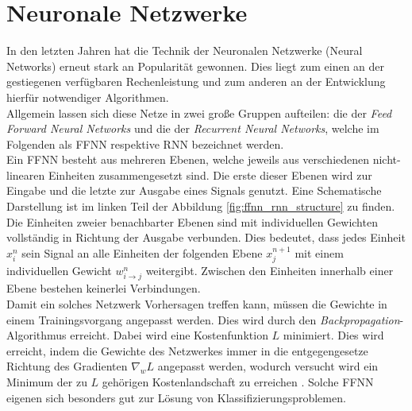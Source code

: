 \section{Neuronale Netzwerke}
In den letzten Jahren hat die Technik der Neuronalen Netzwerke (Neural Networks) erneut stark an Popularität gewonnen. Dies liegt zum einen an der gestiegenen verfügbaren Rechenleistung und zum anderen an der Entwicklung hierfür notwendiger Algorithmen.\\
Allgemein lassen sich diese Netze in zwei große Gruppen aufteilen: die der \textit{Feed Forward Neural Networks} und die der \textit{Recurrent Neural Networks}, welche im Folgenden als \textsc{FFNN} respektive \textsc{RNN} bezeichnet werden.\\

Ein \textsc{FFNN} besteht aus mehreren Ebenen, welche jeweils aus verschiedenen nicht-linearen Einheiten zusammengesetzt sind. Die erste dieser Ebenen wird zur Eingabe und die letzte zur Ausgabe eines Signals genutzt. Eine Schematische Darstellung ist im linken Teil der Abbildung \ref{fig:ffnn_rnn_structure} zu finden. Die Einheiten zweier benachbarter Ebenen sind mit individuellen Gewichten vollständig in Richtung der Ausgabe verbunden. Dies bedeutet, dass jedes Einheit $x^n_i$ sein Signal an alle Einheiten der folgenden Ebene $x^{n+1}_j$ mit einem individuellen Gewicht $w^n_{i \rightarrow j}$ weitergibt. Zwischen den Einheiten innerhalb einer Ebene bestehen keinerlei Verbindungen.\\
Damit ein solches Netzwerk Vorhersagen treffen kann, müssen die Gewichte in einem Trainingsvorgang angepasst werden. Dies wird durch den \textit{Backpropagation}-Algorithmus erreicht. Dabei wird eine Kostenfunktion $L$ minimiert. Dies wird erreicht, indem die Gewichte des Netzwerkes immer in die entgegengesetze Richtung des Gradienten $\nabla_w L$ angepasst werden, wodurch versucht wird ein Minimum der zu $L$ gehörigen Kostenlandschaft zu erreichen \cite{bishop}. Solche \textsc{FFNN} eigenen sich besonders gut zur Lösung von Klassifizierungsproblemen.\\

